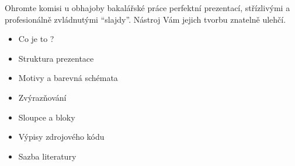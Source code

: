 {
	Ohromte komisi u obhajoby bakalářské práce perfektní prezentací, střízlivými a profesionálně zvládnutými \enquote{slajdy}. Nástroj \BeamerLogo{} Vám jejich tvorbu znatelně ulehčí.
	\begin{itemize}
		\item Co je to \BeamerLogo?
		\item Struktura prezentace
		\item Motivy a barevná schémata
		\item Zvýrazňování
		\item Sloupce a bloky
		\item Výpisy zdrojového kódu
		\item Sazba literatury
	\end{itemize}
}
\endinput
